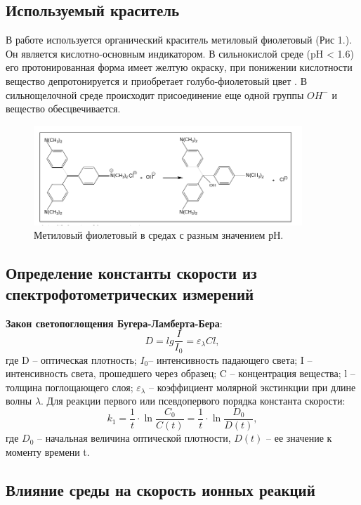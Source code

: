 \documentclass[a4paper,12pt]{article}
\begin{document}
\subsection{Используемый краситель}
В работе используется органический краситель метиловый фиолетовый (Рис 1.). Он является кислотно-основным индикатором. В сильнокислой среде (pH < 1.6) его протонированная форма имеет желтую окраску, при понижении кислотности вещество депротонируется и приобретает голубо-фиолетовый цвет \cite{1} . В сильнощелочной среде происходит присоединение еще одной группы $OH^{-}$ и вещество обесцвечивается.\\
\begin{figure}[h!]
\begin{center}
\includegraphics[width=0.9\textwidth]{reac.png}
\end{center}
\caption{Метиловый фиолетовый в средах с разным значением рН.}
\end{figure}
\subsection{Определение константы скорости из спектрофотометрических измерений}
\textbf{Закон светопоглощения Бугера-Ламберта-Бера}:
\begin{equation}
D = lg\frac{I}{I_{0}} = \varepsilon_{\lambda}Cl,
\end{equation}
где D -- оптическая плотность; $I_{0}$-- интенсивность падающего света; I -- интенсивность
света, прошедшего через образец; C -- концентрация вещества; l -- толщина
поглощающего слоя; $\varepsilon_{\lambda}$ -- коэффициент молярной экстинкции при длине волны $\lambda$.
Для реакции первого или псевдопервого порядка константа скорости:
\begin{equation}
k_{1} = \frac{1}{t} \cdot \ln \frac{C_{0}}{C(t)} = \frac{1}{t} \cdot \ln \frac{D_{0}}{D(t)},
\end{equation}
где $D_{0}$ -- начальная величина оптической плотности, $D(t)$ -- ее значение к моменту времени t.
\subsection{Влияние среды на скорость ионных реакций}
\end{document}
